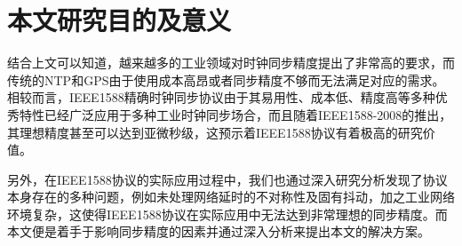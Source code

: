 \section{本文研究目的及意义}
结合上文可以知道，越来越多的工业领域对时钟同步精度提出了非常高的要求，而传统的NTP和GPS由于使用成本高昂或者同步精度不够而无法满足对应的需求。相较而言，IEEE1588精确时钟同步协议由于其易用性、成本低、精度高等多种优秀特性已经广泛应用于多种工业时钟同步场合，而且随着IEEE1588-2008的推出，其理想精度甚至可以达到亚微秒级，这预示着IEEE1588协议有着极高的研究价值。

另外，在IEEE1588协议的实际应用过程中，我们也通过深入研究分析发现了协议本身存在的多种问题，例如未处理网络延时的不对称性及固有抖动，加之工业网络环境复杂，这使得IEEE1588协议在实际应用中无法达到非常理想的同步精度。而本文便是着手于影响同步精度的因素并通过深入分析来提出本文的解决方案。

